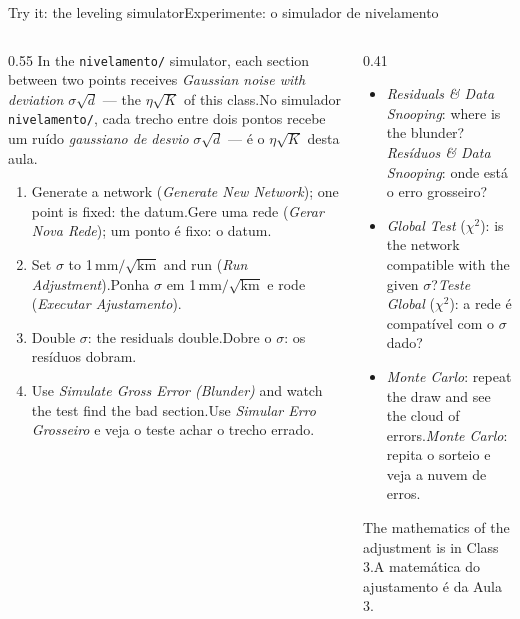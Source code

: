 \documentclass[aspectratio=169,11pt]{beamer}
\newcommand{\tr}[2]{\ifEN#2\else#1\fi}
\begin{document}
\begin{frame}{\tr{Experimente: o simulador de nivelamento}{Try it: the leveling simulator}}
  \begin{columns}[T]
    \begin{column}{0.55\textwidth}
      \footnotesize
      \tr{No simulador \texttt{nivelamento/}, cada trecho entre dois pontos recebe um ruído
      \emph{gaussiano de desvio} $\sigma\sqrt{d}$ --- é o $\eta\sqrt{K}$ desta aula.}{In the
      \texttt{nivelamento/} simulator, each section between two points receives \emph{Gaussian
      noise with deviation} $\sigma\sqrt{d}$ --- the $\eta\sqrt{K}$ of this class.}
      \medskip
      \begin{enumerate}
        \setlength{\itemsep}{2pt}
        \item \tr{Gere uma rede (\emph{Gerar Nova Rede}); um ponto é fixo: o datum.}{Generate a
              network (\emph{Generate New Network}); one point is fixed: the datum.}
        \item \tr{Ponha $\sigma$ em \num{1}\,mm$/\sqrt{\text{km}}$ e rode (\emph{Executar
              Ajustamento}).}{Set $\sigma$ to \num{1}\,mm$/\sqrt{\text{km}}$ and run
              (\emph{Run Adjustment}).}
        \item \tr{Dobre o $\sigma$: os resíduos dobram.}{Double $\sigma$: the residuals
              double.}
        \item \tr{Use \emph{Simular Erro Grosseiro} e veja o teste achar o trecho
              errado.}{Use \emph{Simulate Gross Error (Blunder)} and watch the test find the bad
              section.}
      \end{enumerate}
    \end{column}
    \begin{column}{0.41\textwidth}
      \begin{ideia}[title={\tr{O que olhar}{What to look at}}]
        \footnotesize
        \begin{itemize}
          \setlength{\itemsep}{3pt}
          \item \tr{\emph{Resíduos \& Data Snooping}: onde está o erro grosseiro?}{\emph{Residuals
                \& Data Snooping}: where is the blunder?}
          \item \tr{\emph{Teste Global} ($\chi^2$): a rede é compatível com o $\sigma$
                dado?}{\emph{Global Test} ($\chi^2$): is the network compatible with the given
                $\sigma$?}
          \item \tr{\emph{Monte Carlo}: repita o sorteio e veja a nuvem de erros.}{\emph{Monte
                Carlo}: repeat the draw and see the cloud of errors.}
        \end{itemize}
      \end{ideia}
      \medskip
      {\scriptsize\tr{A matemática do ajustamento é da Aula 3.}{The mathematics of the adjustment
      is in Class 3.}}
    \end{column}
  \end{columns}
\end{frame}
\end{document}

